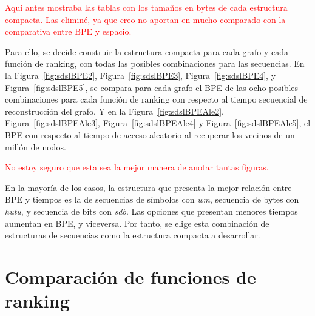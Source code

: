 %
%
%
%
\textcolor{red}{Aquí antes mostraba las tablas con los tamaños en bytes de cada estructura compacta. Las eliminé, ya que creo no aportan en mucho comparado con la comparativa entre BPE y espacio.}

Para ello, se decide construir la estructura compacta para cada grafo y cada función de ranking, con todas las posibles combinaciones para las secuencias. En la Figura~\ref{fig:sdslBPE2}, Figura~\ref{fig:sdslBPE3}, Figura~\ref{fig:sdslBPE4}, y Figura~\ref{fig:sdslBPE5}, se compara para cada grafo el BPE de las ocho posibles combinaciones para cada función de ranking con respecto al tiempo secuencial de reconstrucción del grafo. Y en la Figura~\ref{fig:sdslBPEAle2}, Figura~\ref{fig:sdslBPEAle3}, Figura~\ref{fig:sdslBPEAle4} y Figura~\ref{fig:sdslBPEAle5}, el BPE con respecto al tiempo de acceso aleatorio al recuperar los vecinos de un millón de nodos.

\textcolor{red}{No estoy seguro que esta sea la mejor manera de anotar tantas figuras.}

En la mayoría de los casos, la estructura que presenta la mejor relación entre BPE y tiempos es la de secuencias de símbolos con \textit{wm}, secuencia de bytes con \textit{hutu}, y secuencia de bits con \textit{sdb}.  Las opciones que presentan menores tiempos aumentan en BPE, y viceversa. Por tanto, se elige esta combinación de estructuras de secuencias como la estructura compacta a desarrollar.











\section{Comparación de funciones de ranking}

